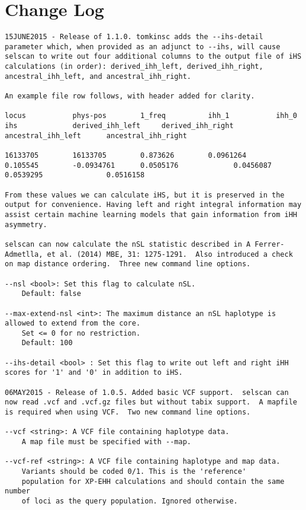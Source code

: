\documentclass[12pt]{article}%
\begin{document}
\section{Change Log}

\begin{lstlisting}
15JUNE2015 - Release of 1.1.0. tomkinsc adds the --ihs-detail parameter which, when provided as an adjunct to --ihs, will cause selscan to write out four additional columns to the output file of iHS calculations (in order): derived_ihh_left, derived_ihh_right, ancestral_ihh_left, and ancestral_ihh_right.

An example file row follows, with header added for clarity.

locus           phys-pos        1_freq          ihh_1           ihh_0           ihs             derived_ihh_left     derived_ihh_right    ancestral_ihh_left      ancestral_ihh_right

16133705        16133705        0.873626        0.0961264       0.105545        -0.0934761      0.0505176             0.0456087           0.0539295               0.0516158

From these values we can calculate iHS, but it is preserved in the output for convenience. Having left and right integral information may assist certain machine learning models that gain information from iHH asymmetry. 

selscan can now calculate the nSL statistic described in A Ferrer-Admetlla, et al. (2014) MBE, 31: 1275-1291.  Also introduced a check on map distance ordering.  Three new command line options.

--nsl <bool>: Set this flag to calculate nSL.
	Default: false

--max-extend-nsl <int>: The maximum distance an nSL haplotype is allowed to extend from the core.
	Set <= 0 for no restriction.
	Default: 100

--ihs-detail <bool> : Set this flag to write out left and right iHH scores for '1' and '0' in addition to iHS.

06MAY2015 - Release of 1.0.5. Added basic VCF support.  selscan can now read .vcf and .vcf.gz files but without tabix support.  A mapfile is required when using VCF.  Two new command line options.

--vcf <string>: A VCF file containing haplotype data.
	A map file must be specified with --map.

--vcf-ref <string>: A VCF file containing haplotype and map data.
	Variants should be coded 0/1. This is the 'reference'
	population for XP-EHH calculations and should contain the same number
	of loci as the query population. Ignored otherwise.


\end{lstlisting}
\end{document}
